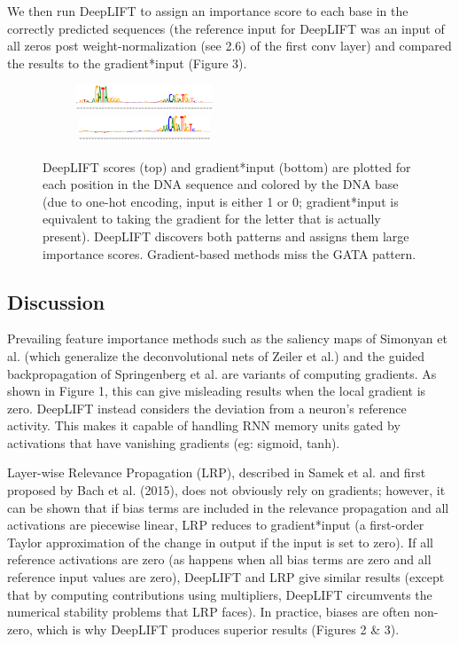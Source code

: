 \documentclass{article}
\begin{document}
We then run DeepLIFT to assign an importance score to each base in the correctly predicted sequences (the reference input for DeepLIFT was an input of all zeros post weight-normalization (see 2.6) of the first conv layer) and compared the results to the gradient*input (Figure 3).

\begin{figure}[!ht]
\vspace{-10px}
\begin{center}
\includegraphics[width=230px,height=30px]{LIFTPADSequence2.png}
\includegraphics[width=230px,height=30px]{GradientSequence2.png}
\caption{DeepLIFT scores (top) and gradient*input (bottom) are plotted for each position in the DNA sequence and colored by the DNA base (due to one-hot encoding, input is either 1 or 0; gradient*input is equivalent to taking the gradient for the letter that is actually present). DeepLIFT discovers both patterns and assigns them large importance scores. Gradient-based methods miss the GATA pattern.}
\end{center}
\vspace{-20px}
\end{figure}
\subsection{Discussion}

Prevailing feature importance methods such as the saliency maps of Simonyan et al. (which generalize the deconvolutional nets of Zeiler et al.) and the guided backpropagation of Springenberg et al. are variants of computing gradients. As shown in Figure 1, this can give misleading results when the local gradient is zero. DeepLIFT instead considers the deviation from a neuron's reference activity. This makes it capable of handling RNN memory units gated by activations that have vanishing gradients (eg: sigmoid, tanh).

Layer-wise Relevance Propagation (LRP), described in Samek et al. and first proposed by Bach et al. (2015), does not obviously rely on gradients; however, it can be shown that if bias terms are included in the relevance propagation and all activations are piecewise linear, LRP reduces to gradient*input (a first-order Taylor approximation of the change in output if the input is set to zero). If all reference activations are zero (as happens when all bias terms are zero and all reference input values are zero), DeepLIFT and LRP give similar results (except that by computing contributions using multipliers, DeepLIFT circumvents the numerical stability problems that LRP faces). In practice, biases are often non-zero, which is why DeepLIFT produces superior results (Figures 2 \& 3).
\end{document}
